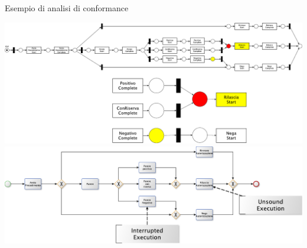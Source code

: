 \documentclass[10pt]{beamer}
\begin{document}
	
	
	
	\begin{frame}{}
	  Esempio di analisi di conformance
	  \begin{center}
	    \includegraphics[scale=0.50]{./fig/ConfPN}\\[10pt]
	    \includegraphics[scale=0.50]{./fig/BPMNConf}
	  \end{center}
	\end{frame}
	
\end{document}
